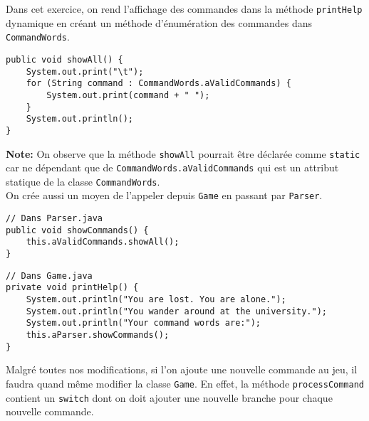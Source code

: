 \begin{exercise}[subtitle=showAll et showCommands]

Dans cet exercice, on rend l'affichage des commandes dans la méthode \verb|printHelp| dynamique en créant un méthode d'énumération des commandes dans \verb|CommandWords|.


\begin{verbatim}
public void showAll() {
    System.out.print("\t");
    for (String command : CommandWords.aValidCommands) {
        System.out.print(command + " ");
    }
    System.out.println();
}
\end{verbatim}

\textbf{Note:} On observe que la méthode \verb|showAll| pourrait être déclarée comme \verb|static| car ne dépendant que de \verb|CommandWords.aValidCommands| qui est un attribut statique de la classe \verb|CommandWords|.\\

On crée aussi un moyen de l'appeler depuis \verb|Game| en passant par \verb|Parser|.

\begin{verbatim}
// Dans Parser.java
public void showCommands() {
    this.aValidCommands.showAll();
}
\end{verbatim}

\begin{verbatim}
// Dans Game.java
private void printHelp() {
    System.out.println("You are lost. You are alone.");
    System.out.println("You wander around at the university.");
    System.out.println("Your command words are:");
    this.aParser.showCommands();
}
\end{verbatim}
\end{exercise}

\begin{exercise}[subtitle=Changer Game ?]

Malgré toutes nos modifications, si l'on ajoute une nouvelle commande au jeu, il faudra quand même modifier la classe \verb|Game|. En effet, la méthode \verb|processCommand| contient un \verb|switch| dont on doit ajouter une nouvelle branche pour chaque nouvelle commande.

\end{exercise}

